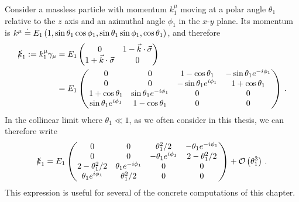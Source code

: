 \begin{subappendices}
\begin{example}
    \label{ex:collinear-kslash}
    Consider a massless particle with momentum \(k_1^\mu\) moving at a polar angle \(\theta_1\) relative to the \(z\) axis and an azimuthal angle \(\phi_1\) in the \(x\)-\(y\) plane.
    Its momentum is \(k^\mu \overset{\boldsymbol{\cdot}}{=} E_1 \left(1, \sin\theta_1\cos\phi_1, \sin\theta_1 \sin\phi_1,\cos\theta_1\right)\), and therefore
    \begin{align}
        \slashed{k}_1
        :=
        k_1^\mu \gamma_\mu
        &=
        E_1 \begin{pmatrix}0 & 1 - \vec{k}\cdot \vec{\sigma} \\ 1 +  \vec{k}\cdot \vec{\sigma} & 0\end{pmatrix}
        \\
        &=
        E_1
        \begin{pmatrix}
            0&0&1 - \cos\theta_1& -\sin\theta_1 e^{-i\phi_1}
            \\
            0&0& -\sin\theta_1 e^{i\phi_1} & 1 + \cos\theta_1
            \\
            1 + \cos\theta_1 & \sin\theta_1 e^{-i\phi_1} & 0 & 0
            \\
            \sin\theta_1 e^{i\phi_1} & 1 - \cos\theta_1 & 0 & 0
        \end{pmatrix}
        \,.
    \end{align}
    In the collinear limit where \(\theta_1 \ll 1\), as we often consider in this thesis, we can therefore write
    \begin{align}
        \slashed{k}_1
        =
        E_1
        \begin{pmatrix}
            0&0& \theta_1^2/2 & -\theta_1 e^{-i\phi_1}
            \\
            0&0 & -\theta_1 e^{i\phi_1} & 2 - \theta_1^2/2
            \\
            2 - \theta_1^2/2 & \theta_1 e^{-i\phi_1} & 0 & 0
            \\
            \theta_1 e^{i \phi_1} & \theta_1^2/2 & 0 & 0
        \end{pmatrix}
        +
        \mathcal{O}\left(\theta_1^3\right)
        \,.
    \end{align}
    This expression is useful for several of the concrete computations of this chapter.
\end{example}




\end{subappendices}

